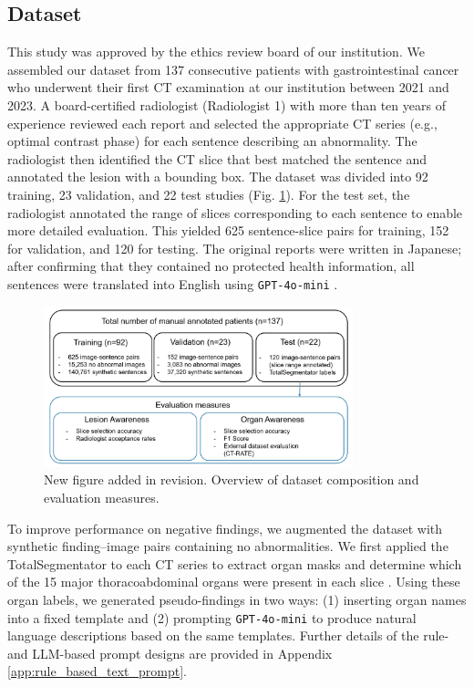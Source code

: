 \documentclass[bioengineering,article,submit,pdftex,moreauthors]{Definitions/mdpi}
\begin{document}
\subsection{Dataset}\label{sec:dataset}
This study was approved by the ethics review board of our institution. 
We assembled our dataset from 137 consecutive patients with gastrointestinal cancer who underwent their ﬁrst CT examination at our institution between 2021 and 2023. 
A board-certified radiologist (Radiologist 1) with more than ten years of experience reviewed each report and selected the appropriate CT series (e.g., optimal contrast phase) for each sentence describing an abnormality. 
The radiologist then identified the CT slice that best matched the sentence and annotated the lesion with a bounding box. 
The dataset was divided into 92 training, 23 validation, and 22 test studies (Fig. \ref{fig:dataset_detail}). 
For the test set, the radiologist annotated the range of slices corresponding to each sentence to enable more detailed evaluation. 
This yielded 625 sentence-slice pairs for training, 152 for validation, and 120 for testing. 
The original reports were written in Japanese; after confirming that they contained no protected health information, all sentences were translated into English using \texttt{GPT-4o-mini} \cite{openai_gpt-4_2024}. 


\begin{figure}[ht]
  \centering
  \includegraphics[width=0.8\textwidth]{./figures/dataset_detail_1.png}
  \caption{
    New figure added in revision. Overview of dataset composition and evaluation measures.
  }
  \label{fig:dataset_detail}
\end{figure}


To improve performance on negative findings, we augmented the dataset with synthetic finding–image pairs containing no abnormalities. 
We first applied the TotalSegmentator to each CT series to extract organ masks and determine which of the 15 major thoracoabdominal organs were present in each slice \cite{wasserthal_totalsegmentator_2023}. 
Using these organ labels, we generated pseudo-findings in two ways: (1) inserting organ names into a fixed template and (2) prompting \texttt{GPT-4o-mini} to produce natural language descriptions based on the same templates. 
Further details of the rule- and LLM-based prompt designs are provided in Appendix \ref{app:rule_based_text_prompt}.
\end{document}
